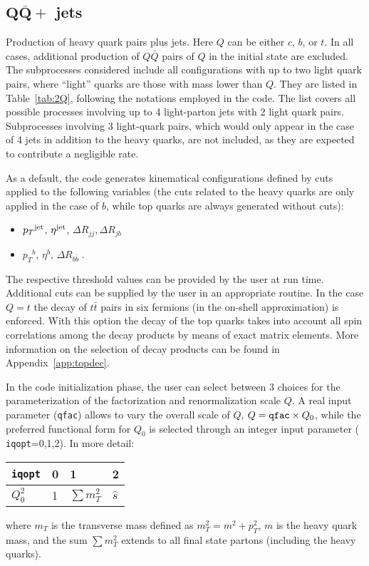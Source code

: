 \documentclass[paper]{JHEP3}
\def    \bbar   {\bar{b}}
\def    \Qbar   {\overline{Q}}
\def    \pt             {\mbox{$p_T$}}
\def    \ptsq           {\mbox{$p^2_T$}}
\def    \mT             {\mbox{$m_T$}}
\def    \mTsq           {\mbox{$m^2_T$}}
\begin{document}
\subsection{$\mathbf{ Q\Qbar+}$ jets}
\label{sec:2Q}
Production of heavy quark pairs plus jets. Here $Q$ can be either $c$,
$b$, or $t$. In all cases, additional production of $Q\bar{Q}$ pairs
of $Q$ in the initial state are excluded.
The subprocesses considered include all configurations with up to two
light quark pairs, where ``light'' quarks are those with mass lower
than $Q$. They are listed in Table~\ref{tab:2Q}, following 
the notations employed in the code. The list covers all possible 
processes involving up to 4 light-parton jets with 2 light quark pairs.
Subprocesses involving 3 light-quark pairs, which would only appear in
the case of 4 jets in addition to the heavy quarks, are not included,
as they are expected to contribute a negligible rate.

As a default, the code generates kinematical configurations defined by
cuts applied to the following variables (the cuts related to the heavy
quarks are only applied in the case of $b$, while top quarks are
always generated without cuts):
\begin{itemize}
\item $\pt^{\rm jet}$, $\eta^{\rm jet}$, $\Delta R_{jj},\Delta R_{jb}$
\item $\pt^{ b}$, $\eta^{ b}$, $\Delta R_{b\bbar} \; .$
\end{itemize}
The respective threshold values can be provided by the user at run
time. Additional cuts can be supplied by the user in an appropriate
routine. In the case $Q=t$ the decay of $t \bar t$ pairs in six fermions 
(in the on-shell approximation) is enforced.
With this option the decay of the top quarks takes into account 
all spin correlations among the decay products by means of exact 
matrix elements. More information on the selection of decay products can 
be found in Appendix~\ref{app:topdec}.

In the code initialization phase, the user can select 
between 3 choices for the parameterization of the 
factorization and renormalization scale $Q$. A real input
parameter ({\tt qfac}) allows to vary the overall scale of $Q$,
$Q={\tt qfac}\times Q_0$, while the preferred functional form for
$Q_0$ is selected through an integer input parameter ({\tt
iqopt}=0,1,2).  In more detail:
{\renewcommand{\arraystretch}{1.2}
\begin{center}
\begin{tabular}{l||l|l|l}
{\tt iqopt} & 0 & 1 & 2\\  \hline
$Q_0^2$ & 1 & $\sum \mTsq$ & $\hat{s}$ \\
\end{tabular}
\end{center}}
where $\mT$ is the transverse mass defined as $\mTsq=m^2+\ptsq$,
$m$ is the heavy quark mass, and the sum $\sum \mTsq $ extends to all final
state partons (including the heavy quarks).
\end{document}
